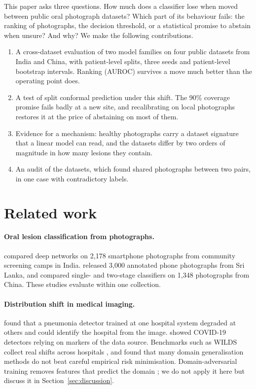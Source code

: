 \documentclass[11pt]{article}
\begin{document}
This paper asks three questions. How much does a classifier lose when moved between public oral photograph datasets? Which part of its behaviour fails: the ranking of photographs, the decision threshold, or a statistical promise to abstain when unsure? And why? We make the following contributions.

\begin{enumerate}
\item A cross-dataset evaluation of two model families on four public datasets from India and China, with patient-level splits, three seeds and patient-level bootstrap intervals. Ranking (AUROC) survives a move much better than the operating point does.
\item A test of split conformal prediction under this shift. The 90\% coverage promise fails badly at a new site, and recalibrating on local photographs restores it at the price of abstaining on most of them.
\item Evidence for a mechanism: healthy photographs carry a dataset signature that a linear model can read, and the datasets differ by two orders of magnitude in how many lesions they contain.
\item An audit of the datasets, which found shared photographs between two pairs, in one case with contradictory labels.
\end{enumerate}

\section{Related work}

\paragraph{Oral lesion classification from photographs.} \citet{talwar2023smartphone} compared deep networks on 2{,}178 smartphone photographs from community screening camps in India. \citet{piyarathne2024dataset} released 3{,}000 annotated phone photographs from Sri Lanka, and \citet{yu2026opmd} compared single- and two-stage classifiers on 1{,}348 photographs from China. These studies evaluate within one collection.

\paragraph{Distribution shift in medical imaging.} \citet{zech2018variable} found that a pneumonia detector trained at one hospital system degraded at others and could identify the hospital from the image. \citet{degrave2021shortcuts} showed COVID-19 detectors relying on markers of the data source. Benchmarks such as WILDS collect real shifts across hospitals \citep{koh2021wilds}, and \citet{gulrajani2021lost} found that many domain generalisation methods do not beat careful empirical risk minimisation. Domain-adversarial training removes features that predict the domain \citep{ganin2016dann}; we do not apply it here but discuss it in Section~\ref{sec:discussion}.
\end{document}
